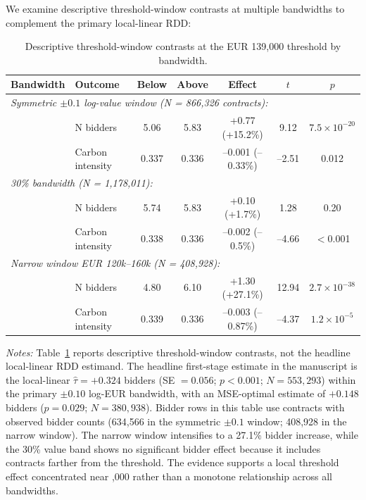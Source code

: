 \documentclass[11pt]{article}
\newcommand{\tabnoteblock}[1]{%
    \par\vspace{0.45em}%
    \begin{minipage}{0.98\linewidth}
    \footnotesize\raggedright #1
    \end{minipage}\par
}
\newcommand{\tabnotes}[1]{\tabnoteblock{\textit{Notes:} #1}}
\begin{document}
We examine descriptive threshold-window contrasts at multiple bandwidths to complement the primary local-linear RDD:

\begin{table}[H]
\centering
\caption{Descriptive threshold-window contrasts at the EUR 139,000 threshold by bandwidth.}
\label{tab:rdd}
\begin{tabular}{llccccc}
\toprule
\textbf{Bandwidth} & \textbf{Outcome} & \textbf{Below} & \textbf{Above} & \textbf{Effect} & \textbf{$t$} & \textbf{$p$} \\
\midrule
\multicolumn{7}{l}{\textit{Symmetric $\pm0.1$ log-value window (N = 866,326 contracts):}} \\
& N bidders & 5.06 & 5.83 & +0.77 (+15.2\%) & 9.12 & $7.5 \times 10^{-20}$ \\
& Carbon intensity & 0.337 & 0.336 & --0.001 (--0.33\%) & --2.51 & 0.012 \\
\midrule
\multicolumn{7}{l}{\textit{30\% bandwidth (N = 1,178,011):}} \\
& N bidders & 5.74 & 5.83 & +0.10 (+1.7\%) & 1.28 & 0.20 \\
& Carbon intensity & 0.338 & 0.336 & --0.002 (--0.5\%) & --4.66 & $<$0.001 \\
\midrule
\multicolumn{7}{l}{\textit{Narrow window EUR 120k--160k (N = 408,928):}} \\
& N bidders & 4.80 & 6.10 & +1.30 (+27.1\%) & 12.94 & $2.7 \times 10^{-38}$ \\
& Carbon intensity & 0.339 & 0.336 & --0.003 (--0.87\%) & --4.37 & $1.2 \times 10^{-5}$ \\
\bottomrule
\end{tabular}

\tabnotes{Table~\ref{tab:rdd} reports descriptive threshold-window contrasts, not the headline local-linear RDD estimand. The headline first-stage estimate in the manuscript is the local-linear $\hat{\tau} = +0.324$ bidders (SE $= 0.056$; $p < 0.001$; $N = 553{,}293$) within the primary $\pm0.10$ log-EUR bandwidth, with an MSE-optimal estimate of $+0.148$ bidders ($p = 0.029$; $N = 380{,}938$). Bidder rows in this table use contracts with observed bidder counts (634,566 in the symmetric $\pm0.1$ window; 408,928 in the narrow window). The narrow window intensifies to a 27.1\% bidder increase, while the 30\% value band shows no significant bidder effect because it includes contracts farther from the threshold. The evidence supports a local threshold effect concentrated near \texteuro139,000 rather than a monotone relationship across all bandwidths.
}
\end{table}
\end{document}
